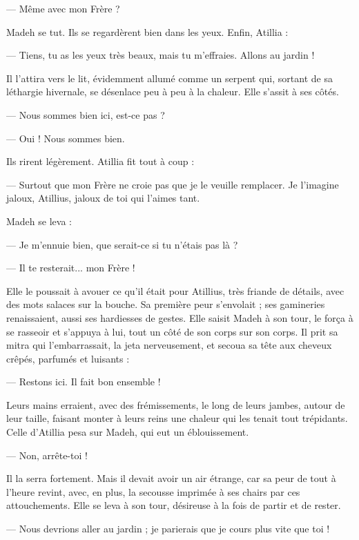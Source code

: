 \documentclass[a4paper, 11pt, oneside, polutonikogreek, french]{article}
\begin{document}
--- Même avec mon Frère ?

Madeh se tut. Ils se regardèrent bien dans les yeux. Enfin, Atillia :

--- Tiens, tu as les yeux très beaux, mais tu m'effraies. Allons au jardin !

Il l'attira vers le lit, évidemment allumé comme un serpent qui, sortant de sa léthargie hivernale, se désenlace peu à peu à la chaleur. Elle s'assit à ses côtés.

--- Nous sommes bien ici, est-ce pas ?

--- Oui ! Nous sommes bien.

Ils rirent légèrement. Atillia fit tout à coup :

--- Surtout que mon Frère ne croie pas que je le veuille remplacer. Je l'imagine jaloux, Atillius, jaloux de toi qui l'aimes tant.

Madeh se leva :

--- Je m'ennuie bien, que serait-ce si tu n'étais pas là ?

--- Il te resterait... mon Frère !

Elle le poussait à avouer ce qu'il était pour Atillius, très friande de détails, avec des mots salaces sur la bouche. Sa première peur s'envolait ; ses gamineries renaissaient, aussi ses hardiesses de gestes. Elle saisit Madeh à son tour, le força à se rasseoir et s'appuya à lui, tout un côté de son corps sur son corps. Il prit sa mitra qui l'embarrassait, la jeta nerveusement, et secoua sa tête aux cheveux crêpés, parfumés et luisants :

--- Restons ici. Il fait bon ensemble !

Leurs mains erraient, avec des frémissements, le long de leurs jambes, autour de leur taille, faisant monter à leurs reins une chaleur qui les tenait tout trépidants. Celle d'Atillia pesa sur Madeh, qui eut un éblouissement.

--- Non, arrête-toi !

Il la serra fortement. Mais il devait avoir un air étrange, car sa peur de tout à l'heure revint, avec, en plus, la secousse imprimée à ses chairs par ces attouchements. Elle se leva à son tour, désireuse à la fois de partir et de rester.

--- Nous devrions aller au jardin ; je parierais que je cours plus vite que toi !
\end{document}
